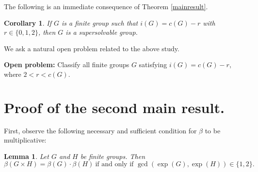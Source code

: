 \documentclass[a4paper,11pt]{amsart}
\numberwithin{equation}{section}
\numberwithin{equation}{subsection}
\newtheorem{corollary}[theorem]{Corollary}
\newtheorem{lemma}[theorem]{Lemma}
\begin{document}
The following is an immediate consequence of Theorem \ref{mainresult}.
\begin{corollary}
    If $G$ is a finite group such that $i(G)=c(G)-r$ with $r\in\{0,1,2\}$, then $G$ is a supersolvable group. 
\end{corollary}

We ask a natural open problem related to the above study. 
\vspace{5mm}

\noindent\textbf{Open problem:} 
Classify all finite groups $G$ satisfying $i(G)=c(G)-r$, where $2< r < c(G)$.



\section{Proof of the second main result.}


First, observe the following necessary and sufficient condition for $\beta$ to be multiplicative:

\begin{lemma} \label{basic property of beta}
    Let $G$ and $H$ be finite groups. Then 
    $$\beta(G\times H)=\beta(G)\cdot\beta(H)\ 
    \text{if and only if } \operatorname{gcd}(\operatorname{exp}(G),\operatorname{exp}(H)) \in \{1,2\}.$$
\end{lemma}
\end{document}
